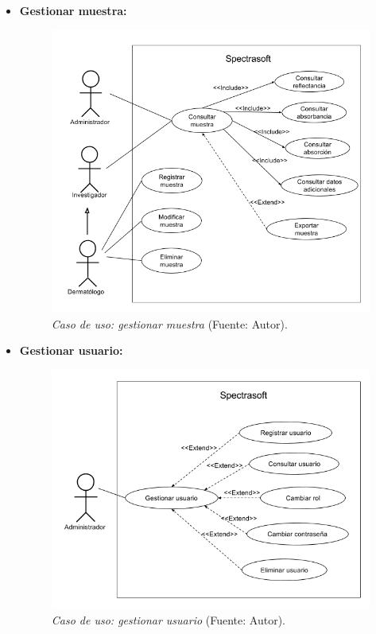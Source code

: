 \begin{itemize}
\newpage
		\item \textbf{Gestionar muestra:}
 	
 		\begin{figure}[H]
		\centering
		\includegraphics[scale=0.5]{img/cu-gestion-muestra.png}
			\caption[Caso de uso: gestionar muestra]{\textit{Caso de uso: gestionar muestra} (Fuente: Autor).}
	\end{figure}
	
		\item \textbf{Gestionar usuario:}
 	
 		\begin{figure}[H]
		\centering
		\includegraphics[scale=0.5]{img/cu-gestion-usuario2.png}
			\caption[Caso de uso: gestionar usuario]{\textit{Caso de uso: gestionar usuario} (Fuente: Autor).}
		\end{figure}
			

\end{itemize}
